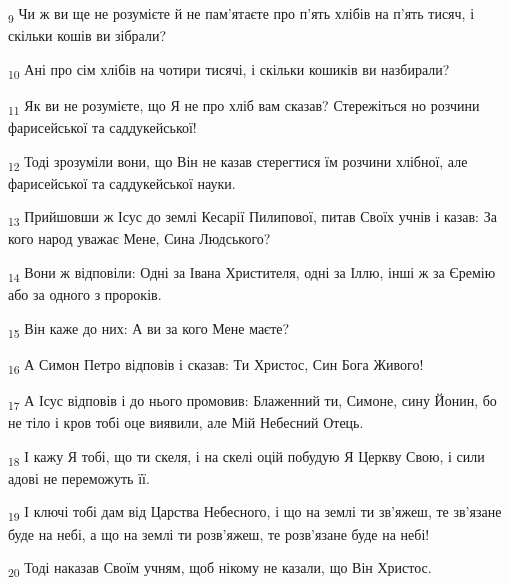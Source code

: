 \begin{tcolorbox}
\textsubscript{9} Чи ж ви ще не розумієте й не пам'ятаєте про п'ять хлібів на п'ять тисяч, і скільки кошів ви зібрали?
\end{tcolorbox}
\begin{tcolorbox}
\textsubscript{10} Ані про сім хлібів на чотири тисячі, і скільки кошиків ви назбирали?
\end{tcolorbox}
\begin{tcolorbox}
\textsubscript{11} Як ви не розумієте, що Я не про хліб вам сказав? Стережіться но розчини фарисейської та саддукейської!
\end{tcolorbox}
\begin{tcolorbox}
\textsubscript{12} Тоді зрозуміли вони, що Він не казав стерегтися їм розчини хлібної, але фарисейської та саддукейської науки.
\end{tcolorbox}
\begin{tcolorbox}
\textsubscript{13} Прийшовши ж Ісус до землі Кесарії Пилипової, питав Своїх учнів і казав: За кого народ уважає Мене, Сина Людського?
\end{tcolorbox}
\begin{tcolorbox}
\textsubscript{14} Вони ж відповіли: Одні за Івана Христителя, одні за Іллю, інші ж за Єремію або за одного з пророків.
\end{tcolorbox}
\begin{tcolorbox}
\textsubscript{15} Він каже до них: А ви за кого Мене маєте?
\end{tcolorbox}
\begin{tcolorbox}
\textsubscript{16} А Симон Петро відповів і сказав: Ти Христос, Син Бога Живого!
\end{tcolorbox}
\begin{tcolorbox}
\textsubscript{17} А Ісус відповів і до нього промовив: Блаженний ти, Симоне, сину Йонин, бо не тіло і кров тобі оце виявили, але Мій Небесний Отець.
\end{tcolorbox}
\begin{tcolorbox}
\textsubscript{18} І кажу Я тобі, що ти скеля, і на скелі оцій побудую Я Церкву Свою, і сили адові не переможуть її.
\end{tcolorbox}
\begin{tcolorbox}
\textsubscript{19} І ключі тобі дам від Царства Небесного, і що на землі ти зв'яжеш, те зв'язане буде на небі, а що на землі ти розв'яжеш, те розв'язане буде на небі!
\end{tcolorbox}
\begin{tcolorbox}
\textsubscript{20} Тоді наказав Своїм учням, щоб нікому не казали, що Він Христос.
\end{tcolorbox}
